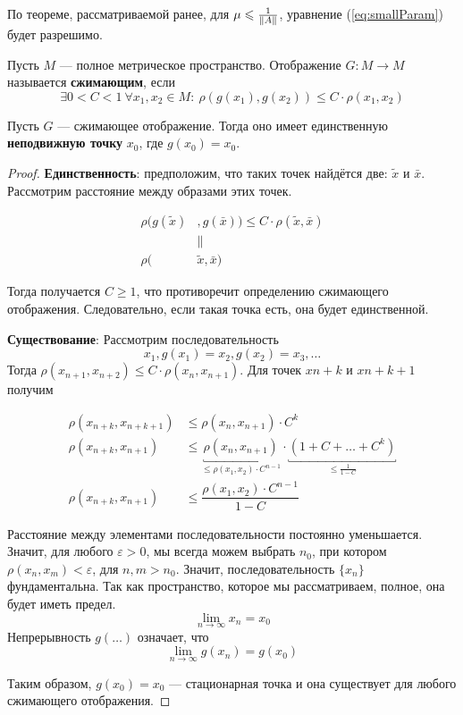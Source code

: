 \documentclass[12pt]{article}
\begin{document}
	По теореме, рассматриваемой ранее, для $\mu \leqslant \frac{1}{\left\| A \right\|}$, уравнение (\ref{eq:smallParam}) будет разрешимо.
	
	\begin{defi}
		Пусть $M$ --- полное метрическое пространство. Отображение $G: M\rightarrow M$ называется \textbf{сжимающим}, если
		$$\exists 0 < C < 1 \: \forall x_1,x_2 \in M\!\!:\: \rho(g(x_1), g(x_2)) \leq C\cdot\rho(x_1,x_2)$$
	\end{defi}
	
	\begin{theorem} \label{th:CompFunc}
		Пусть $G$ --- сжимающее отображение. Тогда оно имеет единственную \textbf{неподвижную точку} $x_0$, где $g(x_0) = x_0$.
	\end{theorem}
	
	\begin{proof}
		\textbf{Единственность}: предположим, что таких точек найдётся две: $\tilde{x}$ и $\bar{x}$. Рассмотрим 
		расстояние между образами этих точек.
		
		\begin{align*}
			\rho(g(\tilde{x})&, g(\bar{x})) \leq C \cdot \rho(\tilde{x}, \bar{x}) \\
			&\parallel \\
			\rho(&\tilde{x}, \bar{x})
		\end{align*}
		
		Тогда получается $C \geq 1$, что противоречит определению сжимающего отображения. Следовательно, если такая точка есть, она
		будет единственной.
		
		\textbf{Существование}: Рассмотрим последовательность 
		$$x_1, g(x_1) = x_2, g(x_2) = x_3, \ldots$$
		Тогда $\rho(x_{n+1},x_{n+2}) \leq C \cdot \rho(x_n, x_{n+1})$. Для точек $x{n+k}$ и $x{n+k+1}$ получим
		
		\begin{align*}
			\rho(x_{n+k},x_{n+k+1}) &\leq \rho(x_n, x_{n+1}) \cdot C^k \\
			\rho(x_{n+k},x_{n+1}) &\leq \underbracket{\rho(x_n, x_{n+1})}_{\leq \rho(x_1, x_2)\cdot C^{n-1}} 
			\cdot \underbracket{(1 + C + \ldots + C^k)}_{\leq \frac{1	}{1-C}} \\
			\rho(x_{n+k},x_{n+1}) &\leq \dfrac{\rho(x_1, x_2)\cdot C^{n-1}}{1-C}
		\end{align*}
		
		Расстояние между элементами последовательности постоянно уменьшается. Значит, для любого $\varepsilon > 0$, мы 
		всегда можем выбрать $n_0$, при котором $\rho(x_n, x_m) < \varepsilon$, для $n,m > n_0$. Значит, последовательность
		$\{x_n\}$ фундаментальна. Так как пространство, которое мы рассматриваем, полное, она будет иметь предел.		
		$$\underset{n \rightarrow \infty}{\lim} x_n = x_0$$		
		Непрерывность $g(\ldots)$ означает, что 
		$$\underset{n \rightarrow \infty}{\lim} g(x_n) = g(x_0)$$
		
		Таким образом, $g(x_0) = x_0$ --- стационарная точка и она существует для любого сжимающего отображения.
	\end{proof}
	
\end{document}
